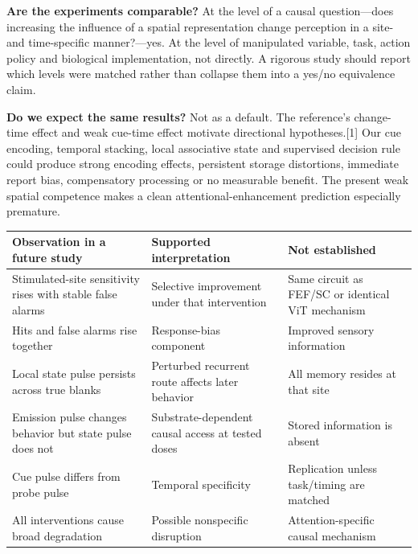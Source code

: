 \documentclass[
  10pt,
]{article}
\newcounter{none} %
\begin{document}
\textbf{Are the experiments comparable?} At the level of a causal
question---does increasing the influence of a spatial representation
change perception in a site- and time-specific manner?---yes. At the
level of manipulated variable, task, action policy and biological
implementation, not directly. A rigorous study should report which
levels were matched rather than collapse them into a yes/no equivalence
claim.

\textbf{Do we expect the same results?} Not as a default. The
reference's change-time effect and weak cue-time effect motivate
directional hypotheses.{[}1{]} Our cue encoding, temporal stacking,
local associative state and supervised decision rule could produce
strong encoding effects, persistent storage distortions, immediate
report bias, compensatory processing or no measurable benefit. The
present weak spatial competence makes a clean attentional-enhancement
prediction especially premature.

{\def\LTcaptype{none} %
\begin{longtable}[]{@{}
  >{\raggedright\arraybackslash}p{}
  >{\raggedright\arraybackslash}p{}
  >{\raggedright\arraybackslash}p{}@{}}
\toprule\noalign{}
\begin{minipage}[b]{\linewidth}\raggedright
Observation in a future study
\end{minipage} & \begin{minipage}[b]{\linewidth}\raggedright
Supported interpretation
\end{minipage} & \begin{minipage}[b]{\linewidth}\raggedright
Not established
\end{minipage} \\
\midrule\noalign{}
\endhead
\bottomrule\noalign{}
\endlastfoot
Stimulated-site sensitivity rises with stable false alarms & Selective
improvement under that intervention & Same circuit as FEF/SC or
identical ViT mechanism \\
Hits and false alarms rise together & Response-bias component & Improved
sensory information \\
Local state pulse persists across true blanks & Perturbed recurrent
route affects later behavior & All memory resides at that site \\
Emission pulse changes behavior but state pulse does not &
Substrate-dependent causal access at tested doses & Stored information
is absent \\
Cue pulse differs from probe pulse & Temporal specificity & Replication
unless task/timing are matched \\
All interventions cause broad degradation & Possible nonspecific
disruption & Attention-specific causal mechanism \\
\end{longtable}
}
\end{document}
